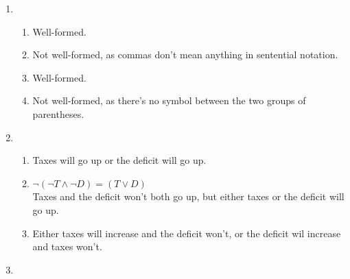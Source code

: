 \documentclass[12pt]{exam}
\begin{document}
\begin{enumerate}
\begin{enumerate}
        \end{enumerate}
    
    \addtocounter{enumi}{2}

    \item  ~\\

        \begin{enumerate} 

            \item Well-formed.

            \item Not well-formed, as commas don't mean anything in sentential notation.

            \item Well-formed.

            \item Not well-formed, as there's no symbol between the two groups of parentheses.

        \end{enumerate}

    \addtocounter{enumi}{2}

    \item ~\\

        \begin{enumerate}

            \item Taxes will go up or the deficit will go up.
            \item $ \lnot ( \lnot T \land \lnot D) = ( T \lor D ) $ \\
                Taxes and the deficit won't both go up, but either taxes or the deficit will go up. 
            \item Either taxes will increase and the deficit won't, or the deficit wil increase and taxes won't.
        
        \end{enumerate}
    
    \item ~\\

        \begin{enumerate}

            \addtocounter{enumi}{1}


\end{enumerate}
\end{enumerate}
\end{document}
